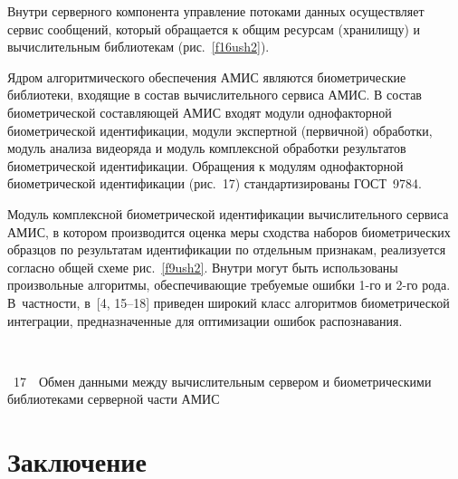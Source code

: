 \begin{multicols}{2}
{}

  
  Внутри серверного компонента управление потоками данных 
осуществляет сервис сообщений, который обращается к общим ресурсам 
(хранилищу) и вычислительным библиотекам (рис.~\ref{f16ush2}). 

 
  Ядром алгоритмического обеспечения АМИС являются биометрические 
библиотеки, входящие в состав вычислительного сервиса АМИС.  В состав 
биометрической составляющей АМИС входят модули однофакторной 
биометрической идентификации, модули экспертной (первичной) обработки, 
модуль анализа видеоряда и модуль комплексной обработки результатов 
биометрической идентификации. Обращения к модулям однофакторной 
биометрической идентификации (рис.~17) стандартизированы 
ГОСТ~9784.


  
  Модуль комплексной биометрической идентификации вычислительного 
сервиса АМИС, в котором производится оценка меры сходства наборов 
биометрических образцов по результатам идентификации по отдельным 
признакам, реализуется согласно общей схеме рис.~\ref{f9ush2}. Внутри могут 
быть использованы произвольные алгоритмы, обеспечивающие требуемые 
ошибки 1-го и 2-го рода. В~частности, в~[4, 15--18] приведен широкий класс\linebreak 
алгоритмов биометрической интеграции, предназначенные для оптимизации 
ошибок распознавания.

  \medskip

\vspace*{1pt}
\begin{center}
\mbox{%
\epsfxsize=79.801mm  
 }
\end{center}
\vspace*{3pt}
{{\figurename~17}\ \ \small{Обмен данными между вычислительным сервером и 
биометрическими библиотеками серверной части АМИС}}
\bigskip
\addtocounter{figure}{1}  
  
  \section{Заключение}
  

\end{multicols}
